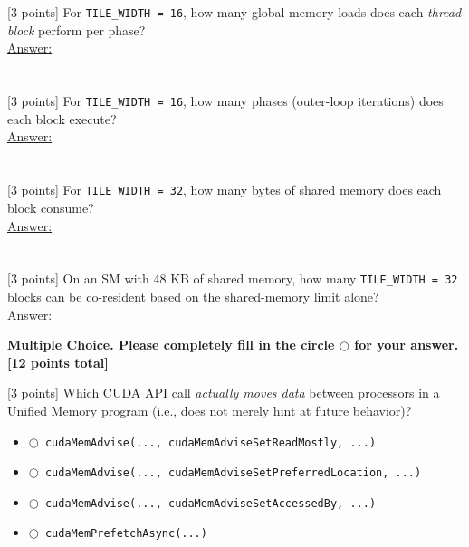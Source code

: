 \documentclass[12pt]{exam}
\newcommand{\Ans}{\underline{Answer:}\ }
\newcommand{\smallbox}{\framebox[5cm]{\rule{0pt}{1.1cm}}}
\newcommand{\mc}{$\bigcirc$\ }
\begin{document}
\begin{questions}
\begin{parts}
  \part {}[3 points] For \texttt{TILE\_WIDTH = 16}, how many global memory loads does each
        \emph{thread block} perform per phase?\\[8pt]
        \Ans \smallbox
  \part {}[3 points] For \texttt{TILE\_WIDTH = 16}, how many phases (outer-loop iterations) does
        each block execute?\\[8pt]
        \Ans \smallbox
  \part {}[3 points] For \texttt{TILE\_WIDTH = 32}, how many bytes of shared memory does each
        block consume?\\[8pt]
        \Ans \smallbox
  \part {}[3 points] On an SM with 48 KB of shared memory, how many \texttt{TILE\_WIDTH = 32}
        blocks can be co-resident based on the shared-memory limit alone?\\[8pt]
        \Ans \smallbox
\end{parts}

\newpage
\textbf{Multiple Choice. \textnormal{Please completely fill in the circle} $\bigcirc$
\textnormal{for your answer.} [12 points total]}

\vspace{6pt}
\question {}[3 points] Which CUDA API call \emph{actually moves data} between processors in a
Unified Memory program (i.e., does not merely hint at future behavior)?
\begin{itemize}[leftmargin=2.5em,itemsep=4pt,label={}]
  \item \mc \texttt{cudaMemAdvise(..., cudaMemAdviseSetReadMostly, ...)}
  \item \mc \texttt{cudaMemAdvise(..., cudaMemAdviseSetPreferredLocation, ...)}
  \item \mc \texttt{cudaMemAdvise(..., cudaMemAdviseSetAccessedBy, ...)}
  \item \mc \texttt{cudaMemPrefetchAsync(...)}
\end{itemize}


\end{questions}
\end{document}
